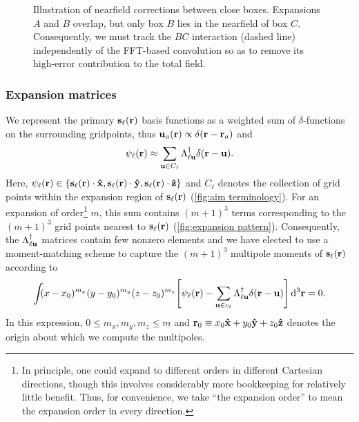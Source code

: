 \begin{figure}
  \centering
  \caption{\label{fig:nearfield correction}Illustration of nearfield corrections between close boxes.
    Expansions $A$ and $B$ overlap, but only box $B$ lies in the nearfield of box $C$.
    Consequently, we must track the $BC$ interaction (dashed line) independently of the FFT-based convolution so as to remove its high-error contribution to the total field.
  }
\end{figure}

\subsubsection{\label{sec:expansion matrices}Expansion matrices}

We represent the primary $\vb{s}_\ell(\vb{r})$ basis functions as a weighted sum of $\delta$-functions on the surrounding gridpoints, thus $\vb{u}_a(\vb{r}) \propto \delta(\vb{r} - \vb{r}_a)$ and
\begin{equation}
  \psi_\ell(\vb{r}) \approx \sum_{\vb{u} \in C_\ell} \Lambda_{\ell\vb{u}}^\dagger \delta(\vb{r} - \vb{u}).
  \label{eq:grid linear combination}
\end{equation}
Here, $\psi_\ell(\vb{r}) \in \qty{\vb{s}_\ell(\vb{r})\cdot \vu{x}, \vb{s}_\ell(\vb{r}) \cdot \vu{y}, \vb{s}_\ell(\vb{r}) \cdot \vu{z}}$ and $C_\ell$ denotes the collection of grid points within the expansion region of $\vb{s}_\ell(\vb{r})$ (\cref{fig:aim terminology}).
For an expansion of order\footnote{In principle, one could expand to different orders in different Cartesian directions, though this involves considerably more bookkeeping for relatively little benefit. Thus, for convenience, we take ``the expansion order'' to mean the expansion order in every direction.} $m$, this sum contains $(m + 1)^3$ terms corresponding to the $(m + 1)^3$ grid points nearest to $\vb{s}_\ell(\vb{r})$ (\cref{fig:expansion pattern}).
Consequently, the $\Lambda_{\ell \vb{u}}^\dagger$ matrices contain few nonzero elements and we have elected to use a moment-matching scheme to capture the $(m + 1)^3$ multipole moments of $\vb{s}_\ell(\vb{r})$ according to
\begin{equation}
  \int_{} \kern0.1em (x - x_0)^{m_x}(y - y_0)^{m_y}(z - z_0)^{m_z} \qty[\psi_\ell(\vb{r}) - \sum_{\vb{u} \in c_\ell} \Lambda_{\ell\vb{u}}^\dagger \delta(\vb{r} - \vb{u})] \dd[3]{\vb{r}} = 0.
  \label{eq:moment matching}
\end{equation}
In this expression, $0 \leqslant m_x, m_y, m_z \leqslant m$ and $\vb{r}_0 \equiv x_0 \vu{x} + y_0 \vu{y} + z_0\vu{z}$ denotes the origin about which we compute the multipoles.
